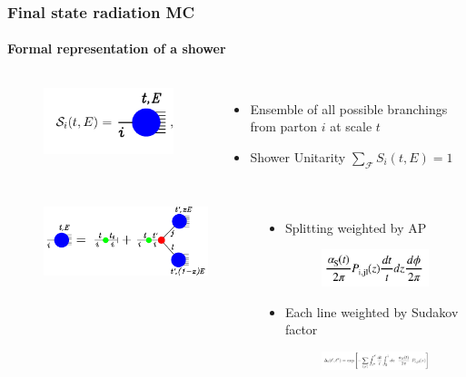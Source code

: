 \documentclass[aspectratio=43]{beamer}
\begin{document}
\begin{frame}

	\frametitle{Final state radiation MC}
	\framesubtitle{Formal representation of a shower}
	
	\begin{columns} 
		
		
		\begin{figure}
			\includegraphics[width = 2.5 cm]{plots/shower_1.png}
		\end{figure}

		
		\begin{itemize}
			\item \footnotesize Ensemble of all possible branchings from parton $i$ at scale $t$
			\item \footnotesize Shower Unitarity $\sum_{\mathcal{F}}S_{i}(t, E) = 1$  
		\end{itemize}

	\end{columns}

	\begin{columns} 

		\column{0.45\textwidth}
				
		\begin{figure}
			\includegraphics[width = 6 cm]{plots/shower_2.png}
		\end{figure}
	
		\column{0.55\textwidth}

		\begin{itemize}
			\item \footnotesize Splitting weighted by AP 
			\begin{figure}
				\includegraphics[width = 2.5 cm]{plots/AP_weight.png}
			\end{figure}
			\item \footnotesize Each line weighted by Sudakov factor
			\begin{figure}
				\includegraphics[width = 5.75 cm]{plots/sudakov.png}
			\end{figure}
		\end{itemize}


\end{columns}
\end{frame}
\end{document}
